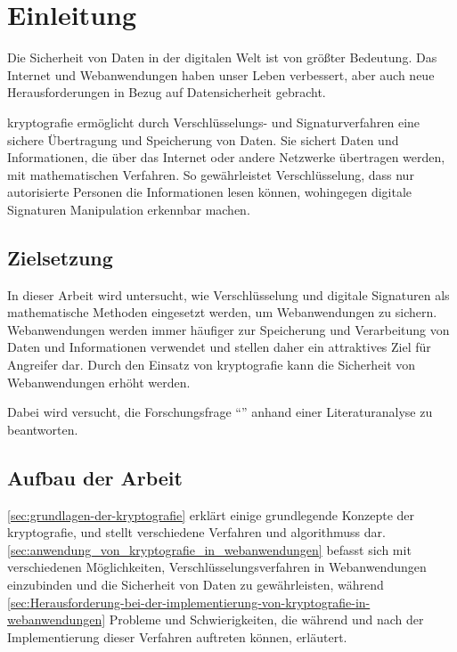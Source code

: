 \section{Einleitung}\label{sec:einleitung}
Die Sicherheit von Daten in der digitalen Welt ist von größter Bedeutung.
Das Internet und Webanwendungen haben unser Leben verbessert, aber auch neue Herausforderungen in Bezug auf Datensicherheit gebracht.

\Gls{kryptografie} ermöglicht durch Verschlüsselungs- und Signaturverfahren eine sichere Übertragung und Speicherung von Daten.
Sie sichert Daten und Informationen, die über das Internet oder andere Netzwerke übertragen werden, mit mathematischen Verfahren. 
So gewährleistet Verschlüsselung, dass nur autorisierte Personen die Informationen lesen können, wohingegen digitale Signaturen Manipulation erkennbar machen.


\subsection{Zielsetzung}\label{subsec:zielsetzung}
In dieser Arbeit wird untersucht, wie Verschlüsselung und digitale Signaturen als mathematische Methoden eingesetzt werden, um Webanwendungen zu sichern.
Webanwendungen werden immer häufiger zur Speicherung und Verarbeitung von Daten und Informationen verwendet und stellen daher ein attraktives Ziel für Angreifer dar.
Durch den Einsatz von \gls{kryptografie} kann die Sicherheit von Webanwendungen erhöht werden.

Dabei wird versucht, die Forschungsfrage \enquote{\myForschungsfrage} anhand einer Literaturanalyse zu beantworten.


\subsection{Aufbau der Arbeit}\label{subsec:aufbau-der-arbeit}
\autoref{sec:grundlagen-der-kryptografie} erklärt einige grundlegende Konzepte der \gls{kryptografie}, und stellt verschiedene  Verfahren und \glspl{algorithmus} dar.
\autoref{sec:anwendung_von_kryptografie_in_webanwendungen} befasst sich mit verschiedenen Möglichkeiten, Verschlüsselungsverfahren in Webanwendungen einzubinden und die Sicherheit von Daten zu gewährleisten, während  \autoref{sec:Herausforderung-bei-der-implementierung-von-kryptografie-in-webanwendungen} Probleme und Schwierigkeiten, die während und nach der Implementierung dieser Verfahren auftreten können, erläutert.